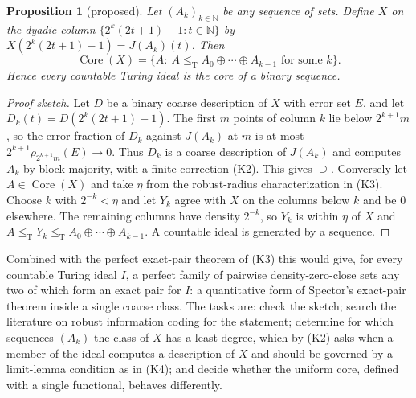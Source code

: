 \documentclass[11pt,a4paper]{article}
\newcommand{\N}{\mathbb N}
\newcommand{\leT}{\leq_{\mathrm T}}
\newcommand{\Core}{\operatorname{Core}}\newcommand{\Low}{\mathcal L}
\newtheorem{proposition}[theorem]{Proposition}
\theoremstyle{definition}\newtheorem{definition}[theorem]{Definition}
\theoremstyle{remark}\newtheorem{remark}[theorem]{Remark}
\begin{document}
\begin{proposition}[proposed]\label{prop:idealcore}
Let $(A_k)_{k\in\N}$ be any sequence of sets. Define $X$ on the dyadic column $\{2^k(2t+1)-1:t\in\N\}$ by $X(2^k(2t+1)-1)=J(A_k)(t)$. Then
\[
 \Core(X)=\{A:\ A\leT A_0\oplus\cdots\oplus A_{k-1}\text{ for some }k\}.
\]
Hence every countable Turing ideal is the core of a binary sequence.
\end{proposition}
\begin{proof}[Proof sketch]
Let $D$ be a binary coarse description of $X$ with error set $E$, and let $D_k(t)=D(2^k(2t+1)-1)$. The first $m$ points of column $k$ lie below $2^{k+1}m$, so the error fraction of $D_k$ against $J(A_k)$ at $m$ is at most $2^{k+1}\rho_{2^{k+1}m}(E)\to0$. Thus $D_k$ is a coarse description of $J(A_k)$ and computes $A_k$ by block majority, with a finite correction (K2). This gives $\supseteq$. Conversely let $A\in\Core(X)$ and take $\eta$ from the robust-radius characterization in (K3). Choose $k$ with $2^{-k}<\eta$ and let $Y_k$ agree with $X$ on the columns below $k$ and be $0$ elsewhere. The remaining columns have density $2^{-k}$, so $Y_k$ is within $\eta$ of $X$ and $A\leT Y_k\leT A_0\oplus\cdots\oplus A_{k-1}$. A countable ideal is generated by a sequence.
\end{proof}
Combined with the perfect exact-pair theorem of (K3) this would give, for every countable Turing ideal $I$, a perfect family of pairwise density-zero-close sets any two of which form an exact pair for $I$: a quantitative form of Spector's exact-pair theorem inside a single coarse class. The tasks are: check the sketch; search the literature on robust information coding for the statement; determine for which sequences $(A_k)$ the class of $X$ has a least degree, which by (K2) asks when a member of the ideal computes a description of $X$ and should be governed by a limit-lemma condition as in (K4); and decide whether the uniform core, defined with a single functional, behaves differently.
\end{document}
